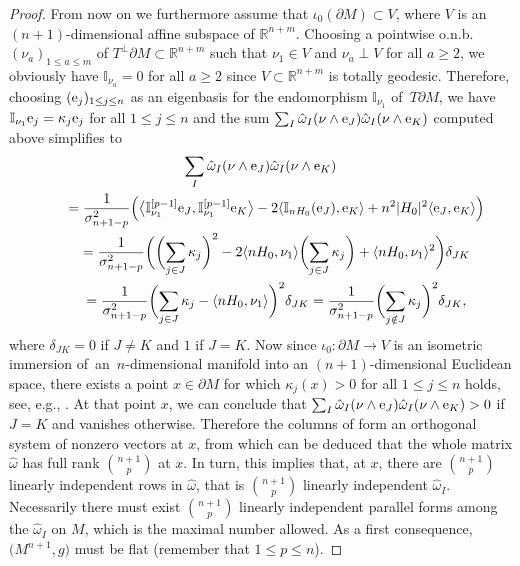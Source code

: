 \begin{proof}
From now on we furthermore assume that $\iota_0(\partial M)\subset V$, where $V$ is an $(n+1)$-dimensional affine subspace of $\mathbb{R}^{n+m}$.
Choosing a pointwise o.n.b.\ $(\nu_a)_{1\leq a\leq m}$ of $T^\perp\partial M\subset\mathbb{R}^{n+m}$ such that $\nu_1\in V$ and $\nu_a\perp V$ for all $a\geq2$, we obviously have $\mathbb{I}_{\nu_a}=0$ for all $a\geq2$ since $V\subset\mathbb{R}^{n+m}$ is totally geodesic. Therefore, choosing $({\rm e}_j)_{1\leq j\leq n}$ as an eigenbasis for the endomorphism $\mathbb{I}_{\nu_1}$ of~$T\partial M$, we have $\mathbb{I}_{\nu_1}{\rm e}_j=\kappa_j {\rm e}_j$ for all $1\leq j\leq n$ and the sum $\sum_I\hat{\omega}_I(\nu\wedge {\rm e}_J)\hat{\omega}_I(\nu\wedge {\rm e}_K)$ computed above simplifies to
\begin{gather*}
\sum_I\hat{\omega}_I(\nu\wedge {\rm e}_J)\hat{\omega}_I(\nu\wedge {\rm e}_K)\\
\qquad{}=\frac{1}{\sigma_{n+1-p}^2}\Big(\bigl\langle \mathbb{I}_{\nu_1}^{[p-1]}{\rm e}_J,\mathbb{I}_{\nu_1}^{[p-1]}{\rm e}_K\bigr\rangle
-2\langle\mathbb{I}_{nH_0}({\rm e}_J),{\rm e}_K\rangle+n^2|H_0|^2\langle {\rm e}_J,{\rm e}_K\rangle\Big)\\
\qquad{}=\frac{1}{\sigma_{n+1-p}^2}\biggl(\biggl(\sum_{j\in J}\kappa_j\biggr)^2-2\langle nH_0,\nu_1\rangle\biggl(\sum_{j\in J}\kappa_j\biggr)+\langle nH_0,\nu_1\rangle^2\biggr)\delta_{JK}\\
\qquad{}=\frac{1}{\sigma_{n+1-p}^2}\biggl(\sum_{j\in J}\kappa_j-\langle nH_0,\nu_1\rangle\biggr)^2\delta_{JK}
=\frac{1}{\sigma_{n+1-p}^2}\biggl(\sum_{j\notin J}\kappa_j\biggr)^2\delta_{JK},
\end{gather*}
where $\delta_{JK}=0$ if $J\neq K$ and $1$ if $J=K$. Now since $\iota_0\colon \partial M\to V$ is an isometric immersion of~an~$n$-dimensional manifold into an $(n+1)$-dimensional Euclidean space, there exists a point $x\in\partial M$ for which $\kappa_j(x)>0$ for all $1\leq j\leq n$ holds, see, e.g., \cite[p.~255]{GallotHulinLafontaine04}. At that point $x$, we can conclude that $\sum_I\hat{\omega}_I(\nu\wedge {\rm e}_J)\hat{\omega}_I(\nu\wedge {\rm e}_K)>0$ if $J=K$ and vanishes otherwise.
Therefore the columns of  form an orthogonal system of nonzero vectors at $x$, from which can be deduced that the whole matrix $\hat{\omega}$ has full rank $\binom{n+1}{p}$ at $x$. In turn, this implies that, at $x$, there are $\binom{n+1}{p}$ linearly independent rows in $\hat{\omega}$, that is $\binom{n+1}{p}$ linearly independent $\hat{\omega}_I$. Necessarily there must exist $\binom{n+1}{p}$ linearly independent parallel forms among the $\hat{\omega}_I$ on $M$, which is the maximal number allowed. As a first consequence, $\bigl(M^{n+1},g\bigr)$ must be flat (remember that $1\leq p\leq n$).

\end{proof}

